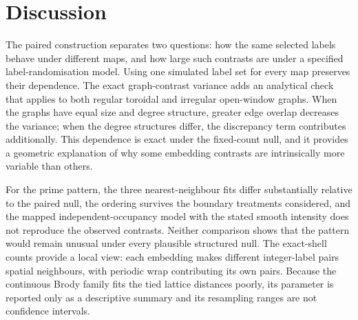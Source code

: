 \documentclass[final,1p,times,authoryear]{elsarticle}
\theoremstyle{definition}
\begin{document}
\section{Discussion}

The paired construction separates two questions: how the same selected labels
behave under different maps, and how large such contrasts are under a specified
label-randomisation model. Using one simulated label set for every map
preserves their dependence. The exact graph-contrast variance adds an
analytical check that applies to both regular toroidal and irregular
open-window graphs. When the graphs have equal size and degree structure,
greater edge overlap decreases the variance; when the degree structures
differ, the discrepancy term contributes additionally. This dependence is
exact under the fixed-count null, and it provides a geometric explanation of
why some embedding contrasts are intrinsically more variable than others.

For the prime pattern, the three nearest-neighbour fits differ substantially
relative to the paired null, the ordering survives the boundary treatments
considered, and the mapped independent-occupancy model with the stated smooth
intensity does not reproduce the observed contrasts. Neither comparison shows
that the pattern would remain unusual under every plausible structured null.
The exact-shell counts provide a local view: each embedding makes different
integer-label pairs spatial neighbours, with periodic wrap contributing its
own pairs. Because the continuous Brody family fits the tied lattice
distances poorly, its parameter is reported only as a descriptive summary and
its resampling ranges are not confidence intervals.
\end{document}
